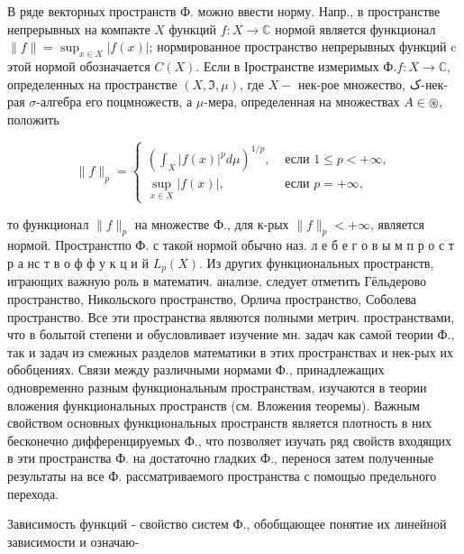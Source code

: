 \documentclass[10pt]{article}
\begin{document}
В ряде векторных пространств Ф. можно ввести норму. Напр., в пространстве непрерывных на компакте $X$ функций $f: X \longrightarrow \mathbb{C}$ нормой является функционал $\|f\|=\sup _{x \in X}|f(x)|$; нормированное пространство непрерывных функций $\mathrm{c}$ этой нормой обозначается $C(X)$. Если в Іространстве измеримых $Ф . f: X \rightarrow \mathbb{C}$, определенных на пространстве $(X, \Im, \mu)$, где $X-$ нек-рое множество, ک-нек-рая $\sigma$-алгебра его поцмножеств, а $\mu$-мера, определенная на множествах $A \in \circledast$, положить



\[

\|f\|_{p}= \begin{cases}\left(\int_{X}|f(x)|^{p} d \mu\right)^{1 / p}, & \text { если } 1 \leqslant p<+\infty, \\ \sup _{x \in X}|f(x)|, & \text { если } p=+\infty,\end{cases}

\]



то функционал $\|f\|_{p}$ на множестве Ф., для к-рых $\|f\|_{p}<+\infty$, является нормой. Пространстпо Ф. с такой нормой обычно наз. л е б е г о в ы м п р о с т р а нс т в о ф ф у к ц и й $L_{p}(X)$. Из других функциональных пространств, играющих важную роль в математич. анализе, следует отметить Гёльдерово пространство, Никольского пространство, Орлича пространство, Соболева пространство. Все эти пространства являются полными метрич. пространствами, что в болытой степени и обусловливает изучение мн. задач как самой теории Ф., так и задач из смежных разделов математики в этих пространствах и нек-рых их обобцениях. Связи между различными нормами Ф., принадлежащих одновременно разным функциональным пространствам, изучаются в теории вложения функциональных пространств (см. Вложения теоремы). Важным свойством основных функциональных пространств является плотность в них бесконечно дифференцируемых Ф., что позволяет изучать ряд свойств входящих в эти пространства Ф. на достаточно гладких Ф., перенося затем полученные результаты на все Ф. рассматриваемого пространства с помощыо предельного перехода.



Зависимость функций - свойство систем Ф., обобщающее понятие их линейной зависимости и означаю-
\end{document}
